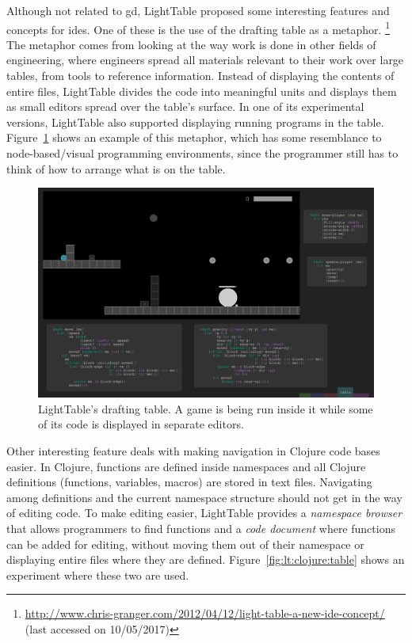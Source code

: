 Although not related to \gls{gd}, LightTable proposed some interesting features and concepts for \glspl{ide}.
One of these is the use of the drafting table as a metaphor.%
\footnote{\url{http://www.chris-granger.com/2012/04/12/light-table-a-new-ide-concept/} (last accessed on 10/05/2017)}
The metaphor comes from looking at the way work is done in other fields of engineering, where engineers spread all materials relevant to their work over large tables, from tools to reference information.
Instead of displaying the contents of entire files, LightTable divides the code into meaningful units and displays them as small editors spread over the table's surface.
In one of its experimental versions, LightTable also supported displaying running programs in the table.
Figure~\ref{fig:lt:draft:table} shows an example of this metaphor, which has some resemblance to node-based/visual programming environments, since the programmer still has to think of how to arrange what is on the table.

\begin{figure}
  \centering
  \includegraphics[width=1.0\textwidth]{./images/lt_game_example}
  \caption[LightTable's drafting table showing a game.]{LightTable's drafting table. A game is being run inside it while some of its code is displayed in separate editors.}
  \label{fig:lt:draft:table}
\end{figure}

Other interesting feature deals with making navigation in Clojure code bases easier.
In Clojure, functions are defined inside namespaces and all Clojure definitions (functions, variables, macros) are stored in text files.
Navigating among definitions and the current namespace structure should not get in the way of editing code.
To make editing easier, LightTable provides a \emph{namespace browser} that allows programmers to find functions and a \emph{code document} where functions can be added for editing, without moving them out of their namespace or displaying entire files where they are defined.
Figure~\ref{fig:lt:clojure:table} shows an experiment where these two are used.

